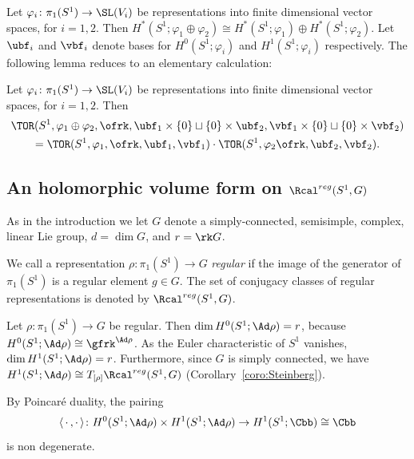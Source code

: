 Let $\varphi_i\colon\pi_1(S^1)\to\SL(V_i)$ be representations into finite dimensional vector spaces, for $i=1,2$. Then $H^*(S^1;\varphi_1\oplus\varphi_2)\cong H^*(S^1;\varphi_1)\oplus H^*(S^1;\varphi_2)$. Let $\ubf_i$ and $\vbf_i$ denote bases for $H^0(S^1;\varphi_i)$ and $H^1(S^1;\varphi_i)$ respectively. The following lemma reduces to an elementary calculation:

\begin{lemm}\label{lem:TOR_mult}
Let $\varphi_i\colon\pi_1(S^1)\to\SL(V_i)$ be representations into finite dimensional vector spaces, for $i=1,2$. Then
\begin{multline*}
\TOR(S^1,\varphi_1\oplus\varphi_2,\ofrk,\ubf_1\times\{0\}\sqcup\{0\}\times\ubf_2,\vbf_1\times\{0\}\sqcup\{0\}\times\vbf_2)
\\ =\TOR(S^1,\varphi_1,\ofrk,\ubf_1,\vbf_1) \cdot
\TOR(S^1,\varphi_2\ofrk,\ubf_2,\vbf_2).
\end{multline*}
\end{lemm}



\subsection{An holomorphic volume form on \texorpdfstring{$\Rcal^{reg}(S^1,G)$}{Rreg(S1,G)}}\label{sec:peripheral}

As in the introduction we let $G$ denote a simply-connected, semisimple, complex, linear Lie group, $d = \dim G$, and $r =\rk G$.

\begin{defi}\label{def:regular_rep}
We call a representation $\rho\colon\pi_1(S^1)\to G$ \emph{regular} if the image of the generator of $\pi_1(S^1)$ is a regular element ${g}\in G$. The set of conjugacy classes of regular representations is denoted by $\Rcal^{reg}(S^1,G)$.
\end{defi}

Let $\rho\colon\pi_1(S^1)\to G$ be regular. Then $\dim H^0(S^1;\Ad\rho)=r$, because $H^0(S^1;\Ad\rho)\cong\gfrk^{\Ad \rho}$. As the Euler characteristic of $S^1$ vanishes, $\dim H^1(S^1;\Ad\rho)=r $. Furthermore, since $G$ is simply connected, we have $H^1(S^1;\Ad\rho)\cong T_{[\rho]} \Rcal^{reg}(S^1,G)$ (Corollary~\ref{coro:Steinberg}).

By Poincaré duality, the pairing
\[
\langle \,\cdot\,,\cdot\, \rangle \colon H^0(S^1;\Ad\rho)\times H^1(S^1;\Ad\rho) \to H^1(S^1;\Cbb)\cong \Cbb
\]
is non degenerate.



